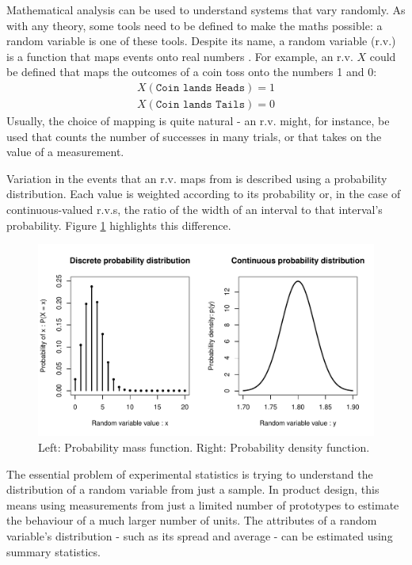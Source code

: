 \documentclass[11pt,a4paper,article]{memoir} %
\begin{document}
Mathematical analysis can be used to understand systems that vary randomly. As with any theory, some tools need to be defined to make the maths possible: a random variable is one of these tools. Despite its name, a random variable (r.v.) is a function that maps events onto real numbers \cite{blitzstein2014introduction}. For example, an r.v. $X$ could be defined that maps the outcomes of a coin toss onto the numbers 1 and 0:
 \begin{align}
	X(\texttt{Coin lands Heads}) = 1 \\
	X(\texttt{Coin lands Tails}) =0
 \end{align}
Usually, the choice of mapping is quite natural - an r.v. might, for instance, be used that counts the number of successes in many trials, or that takes on the value of a measurement. 
\par
Variation in the events that an r.v. maps from is described using a probability distribution. Each value is weighted according to its probability or, in the case of continuous-valued r.v.s, the ratio of the width of an interval to that interval's probability. Figure \ref{fig:example_pd} highlights this difference.
\begin{figure}[h!]
\includegraphics[width=\textwidth]{probability_distributions.pdf}
\caption{Left: Probability mass function. Right: Probability density function.}
\label{fig:example_pd}
\end{figure}
\par
The essential problem of experimental statistics is trying to understand the distribution of a random variable from just a sample. In product design, this means using measurements from just a limited number of prototypes to estimate the behaviour of a much larger number of units. The attributes of a random variable's distribution - such as its spread and average - can be estimated using summary statistics.
\end{document}

